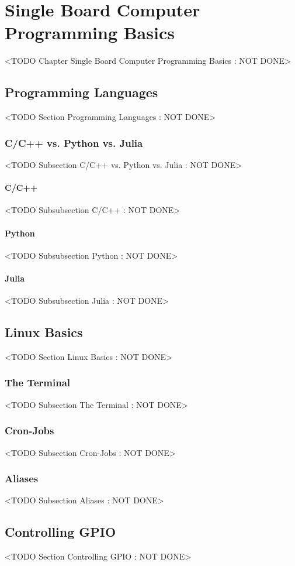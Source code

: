 \chapter{Single Board Computer Programming Basics}
	<TODO Chapter Single Board Computer Programming Basics : NOT DONE>

\section{Programming Languages}
	<TODO Section Programming Languages : NOT DONE>

\subsection{C/C++ vs. Python vs. Julia}
	<TODO Subsection C/C++ vs. Python vs. Julia : NOT DONE>

\subsubsection{C/C++}
	<TODO Subsubsection  C/C++ : NOT DONE>

\subsubsection{Python}
	<TODO Subsubsection  Python : NOT DONE>

\subsubsection{Julia}
	<TODO Subsubsection  Julia : NOT DONE>

\section{Linux Basics}
	<TODO Section Linux Basics : NOT DONE>

\subsection{The Terminal}
	<TODO Subsection The Terminal : NOT DONE>

\subsection{Cron-Jobs}
	<TODO Subsection Cron-Jobs : NOT DONE>

\subsection{Aliases}
	<TODO Subsection Aliases : NOT DONE>

\section{Controlling GPIO}
	<TODO Section Controlling GPIO : NOT DONE>

